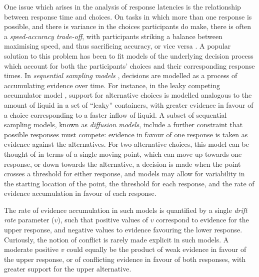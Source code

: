 One issue which arises in the analysis of response latencies
is the relationship between response time and choices.
On tasks in which more than one response is possible,
and there is variance in the choices participants do make,
there is often a \emph{speed-accuracy trade-off},
with participants striking a balance between
maximising speed, and thus sacrificing accuracy,
or vice versa \citep{Garrett1922}.
A popular solution to this problem has been to
fit models of the underlying decision process
which account for both the participants' choices
and their corresponding response times.
In \emph{sequential sampling models}
\citet{Ratcliff1978,Ratcliff2008a,Busemeyer1993},
decisions are modelled as a process of accumulating evidence over time.
For instance, in the leaky competing accumulator model \citep{Usher2001},
support for alternative choices is modelled analogous to
the amount of liquid in a set of ``leaky'' containers,
with greater evidence in favour of a choice
corresponding to a faster inflow of liquid.
A subset of sequential sampling models,
known as \emph{diffusion models},
include a further constraint that possible responses must compete:
evidence in favour of one response
is taken as evidence against the alternatives.
For two-alternative choices,
this model can be thought of in terms of
a single moving point,
which can move up towards one response,
or down towards the alternative,
a decision is made when the point
crosses a threshold for either response,
and models may allow for variability in the starting location of the point,
the threshold for each response,
and the rate of evidence accumulation in favour of each response.



The rate of evidence accumulation in such models
is quantified by a single \emph{drift rate} parameter (\(v\)),
such that positive values of \(v\) correspond to evidence for the upper response,
and negative values to evidence favouring the lower response.
Curiously, the notion of conflict is rarely made explicit in such models.
A moderate positive \(v\) could equally be
the product of weak evidence in favour of the upper response,
or of conflicting evidence in favour of both responses,
with greater support for the upper alternative.

